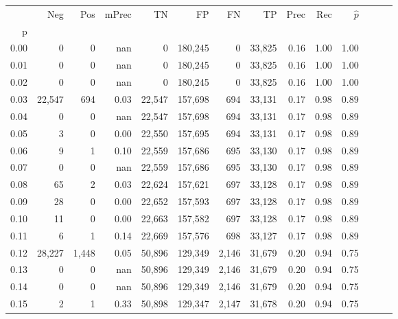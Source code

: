\begin{tabular}{rrrrrrrrrrrrrr}
\toprule
{} &     Neg &    Pos & mPrec &       TN &       FP &      FN &      TP &  Prec &   Rec & $\hat{p}$ \\
p    &         &        &       &          &          &         &         &       &       &           \\
\midrule
0.00 &       0 &      0 &   nan &        0 &  180,245 &       0 &  33,825 &  0.16 &  1.00 &      1.00 \\
0.01 &       0 &      0 &   nan &        0 &  180,245 &       0 &  33,825 &  0.16 &  1.00 &      1.00 \\
0.02 &       0 &      0 &   nan &        0 &  180,245 &       0 &  33,825 &  0.16 &  1.00 &      1.00 \\
0.03 &  22,547 &    694 &  0.03 &   22,547 &  157,698 &     694 &  33,131 &  0.17 &  0.98 &      0.89 \\
0.04 &       0 &      0 &   nan &   22,547 &  157,698 &     694 &  33,131 &  0.17 &  0.98 &      0.89 \\
0.05 &       3 &      0 &  0.00 &   22,550 &  157,695 &     694 &  33,131 &  0.17 &  0.98 &      0.89 \\
0.06 &       9 &      1 &  0.10 &   22,559 &  157,686 &     695 &  33,130 &  0.17 &  0.98 &      0.89 \\
0.07 &       0 &      0 &   nan &   22,559 &  157,686 &     695 &  33,130 &  0.17 &  0.98 &      0.89 \\
0.08 &      65 &      2 &  0.03 &   22,624 &  157,621 &     697 &  33,128 &  0.17 &  0.98 &      0.89 \\
0.09 &      28 &      0 &  0.00 &   22,652 &  157,593 &     697 &  33,128 &  0.17 &  0.98 &      0.89 \\
0.10 &      11 &      0 &  0.00 &   22,663 &  157,582 &     697 &  33,128 &  0.17 &  0.98 &      0.89 \\
0.11 &       6 &      1 &  0.14 &   22,669 &  157,576 &     698 &  33,127 &  0.17 &  0.98 &      0.89 \\
0.12 &  28,227 &  1,448 &  0.05 &   50,896 &  129,349 &   2,146 &  31,679 &  0.20 &  0.94 &      0.75 \\
0.13 &       0 &      0 &   nan &   50,896 &  129,349 &   2,146 &  31,679 &  0.20 &  0.94 &      0.75 \\
0.14 &       0 &      0 &   nan &   50,896 &  129,349 &   2,146 &  31,679 &  0.20 &  0.94 &      0.75 \\
0.15 &       2 &      1 &  0.33 &   50,898 &  129,347 &   2,147 &  31,678 &  0.20 &  0.94 &      0.75 \\

\end{tabular}
